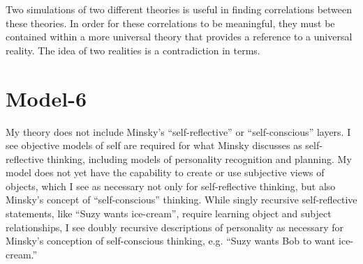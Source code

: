 Two simulations of two different theories is useful in finding
correlations between these theories.  In order for these correlations
to be meaningful, they must be contained within a more universal
theory that provides a reference to a universal reality.  The idea of
two realities is a contradiction in terms.


\section{Model-6}

My theory does not include Minsky's ``self-reflective'' or
``self-conscious'' layers.  I see objective models of self are
required for what Minsky discusses as self-reflective thinking,
including models of personality recognition and planning.  My model
does not yet have the capability to create or use subjective views of
objects, which I see as necessary not only for self-reflective
thinking, but also Minsky's concept of ``self-conscious'' thinking.
While singly recursive self-reflective statements, like ``Suzy wants
ice-cream'', require learning object and subject relationships, I see
doubly recursive descriptions of personality as necessary for Minsky's
conception of self-conscious thinking, e.g. ``Suzy wants Bob to want
ice-cream.''

